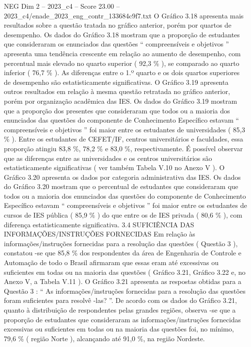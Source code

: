 \begin{textsample}{NEG Dim 2 – 2023\_c4 – Score 23.00 – 2023\_c4/enade\_2023\_eng\_contr\_133684c9f7.txt}
O Gráfico 3.18 apresenta mais resultados sobre a questão tratada no gráfico anterior, porém por quartos de desempenho.
Os dados do Gráfico 3.18 mostram que a proporção de estudantes que consideraram os enunciados das questões “ compreensíveis e objetivos ” apresenta uma tendência crescente em relação ao aumento de desempenho, com percentual mais elevado no quarto superior ( 92,3 \% ), se comparado ao quarto inferior ( 76,7 \% ).
As diferenças entre o 1.º quarto e os dois quartos superiores de desempenho são estatisticamente significativas.
O Gráfico 3.19 apresenta outros resultados em relação à mesma questão retratada no gráfico anterior, porém por organização acadêmica das IES.
Os dados do Gráfico 3.19 mostram que a proporção dos presentes que consideraram que todos ou a maioria dos enunciados das questões do componente de Conhecimento Específico estavam “ compreensíveis e objetivos ” foi maior entre os estudantes de universidades ( 85,3 \% ).
Entre os estudantes de CEFET/IF, centros universitários e faculdades, essa proporção atingiu 83,8 \%, 78,2 \% e 83,0 \%, respectivamente.
É possível observar que as diferenças entre as universidades e os centros universitários são estatisticamente significativas ( ver também Tabela V.10 no Anexo V ).
O Gráfico 3.20 apresenta os dados por categoria administrativa das IES.
Os dados do Gráfico 3.20 mostram que o percentual de estudantes que consideraram que todos ou a maioria dos enunciados das questões do componente de Conhecimento Específico estavam “ compreensíveis e objetivos ” foi maior entre os estudantes de cursos de IES pública ( 85,9 \% ) do que entre os de IES privada ( 80,6 \% ), com diferença estatisticamente significativa. 3.4 SUFICIÊNCIA DAS INFORMAÇÕES/INSTRUÇÕES FORNECIDAS Em relação às informações/instruções fornecidas para a resolução das questões ( Questão 3 ), constatou -se que 85,8 \% dos respondentes da área de Engenharia de Controle e Automação de todo o Brasil afirmaram que essas eram até excessivas ou suficientes em todas ou na maioria das questões ( Gráfico 3.21, Gráfico 3.22 e, no Anexo V, a Tabela V.11 ).
O Gráfico 3.21 apresenta as respostas obtidas para a Questão 3 : “ As informações/instruções fornecidas para a resolução das questões foram suficientes para resolvê -las? ”.
De acordo com os dados do Gráfico 3.21, quanto à distribuição de respondentes pelas grandes regiões, observa -se que a proporção de estudantes que consideraram as informações/instruções fornecidas excessivas ou suficientes em todas ou na maioria das questões foi, no mínimo, 79,6 \% ( região Norte ), alcançando até 91,0 \%, na região Nordeste.

\end{textsample}
